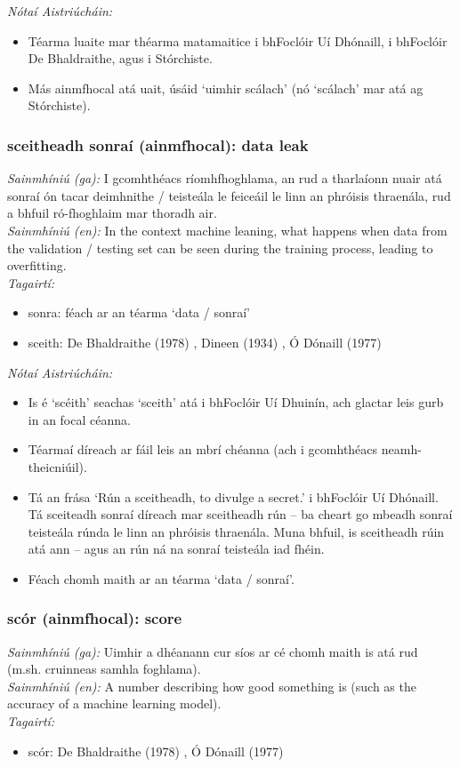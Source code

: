  \noindent \textit{Nótaí Aistriúcháin:}
\begin{itemize}
	\item Téarma luaite mar théarma matamaitice i bhFoclóir Uí Dhónaill, i bhFoclóir De Bhaldraithe, agus i Stórchiste.
	\item Más ainmfhocal atá uait, úsáid `uimhir scálach' (nó `scálach' mar atá ag Stórchiste).
\end{itemize}


\subsubsection*{sceitheadh sonraí (ainmfhocal): data leak}
 \noindent \textit{Sainmhíniú (ga):} I gcomhthéacs ríomhfhoghlama, an rud a tharlaíonn nuair atá sonraí ón tacar deimhnithe / teisteála le feiceáil le linn an phróisis thraenála, rud a bhfuil ró-fhoghlaim mar thoradh air.
\\
 \noindent \textit{Sainmhíniú (en):} In the context machine leaning, what happens when data from the validation / testing set can be seen during the training process, leading to overfitting.
\\
 \noindent \textit{Tagairtí:}
\begin{itemize}
	\item sonra: féach ar an téarma `data / sonraí'
	\item sceith: De Bhaldraithe (1978) \cite{de-bhaldraithe}, Dineen (1934) \cite{dineen}, Ó Dónaill (1977) \cite{odonaill}
\end{itemize}

 \noindent \textit{Nótaí Aistriúcháin:}
\begin{itemize}
	\item Is é `scéith' seachas `sceith' atá i bhFoclóir Uí Dhuinín, ach glactar leis gurb in an focal céanna.
	\item Téarmaí díreach ar fáil leis an mbrí chéanna (ach i gcomhthéacs neamh-theicniúil).
	\item Tá an frása `Rún a sceitheadh, to divulge a secret.' i bhFoclóir Uí Dhónaill. Tá sceiteadh sonraí díreach mar sceitheadh rún -- ba cheart go mbeadh sonraí teisteála rúnda le linn an phróisis thraenála. Muna bhfuil, is sceitheadh rúin atá ann -- agus an rún ná na sonraí teisteála iad fhéin.
	\item Féach chomh maith ar an téarma `data / sonraí'.
\end{itemize}


\subsubsection*{scór (ainmfhocal): score}
 \noindent \textit{Sainmhíniú (ga):} Uimhir a dhéanann cur síos ar cé chomh maith is atá rud (m.sh. cruinneas samhla foghlama).
\\
 \noindent \textit{Sainmhíniú (en):} A number describing how good something is (such as the accuracy of a machine learning model).
\\
 \noindent \textit{Tagairtí:}
\begin{itemize}
	\item scór: De Bhaldraithe (1978) \cite{de-bhaldraithe}, Ó Dónaill (1977) \cite{odonaill}
\end{itemize}

